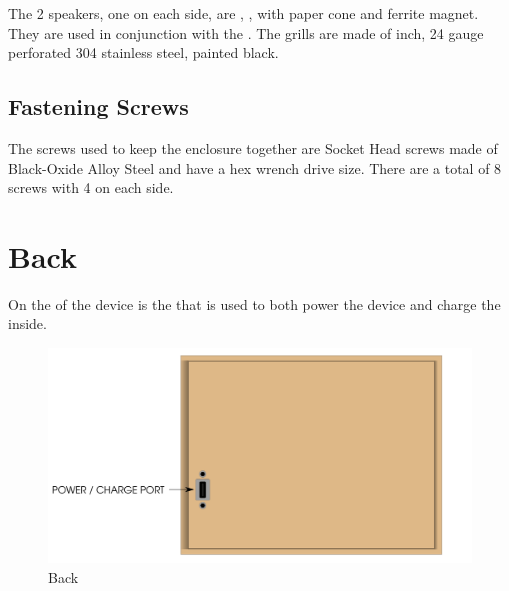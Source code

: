 The \num{2} speakers, one on each side, are \mono{8\thinspace\small{$\Omega$}},
,  with paper cone and ferrite magnet.
They are used in conjunction with the \hyperref[Audio]{}.  The grills are
made of  inch, \num{24} gauge perforated \num{304} stainless steel,
painted black.

\section{Fastening Screws} \label{Fastening Screws}

The screws used to keep the enclosure together are  Socket Head
screws made of Black-Oxide Alloy Steel and have a  hex wrench drive
size.  There are a total of \num{8} screws with \num{4} on each side.


\chapter{Back} \label{Back}

On the  of the device is the  that is used to both power the
device and charge the \hyperref[Rechargeable Battery]{} inside.

\begin{figure}[H]
\centering
  \includegraphics{images/back.png}
\caption{Back}
\end{figure}

